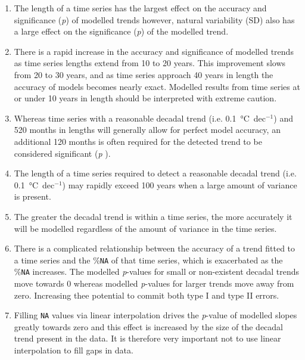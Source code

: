 \documentclass[]{ametsoc}
\begin{document}
\begin{enumerate}
\item The length of a time series has the largest effect on the accuracy and significance (\emph{p}) of modelled trends however, natural variability (SD) also has a large effect on the significance (\emph{p}) of the modelled trend.

\item There is a rapid increase in the accuracy and significance of modelled trends as time series lengths extend from 10 to 20 years. This improvement slows from 20 to 30 years, and as time series approach 40 years in length the accuracy of models becomes nearly exact. Modelled results from time series at or under 10 years in length should be interpreted with extreme caution.

\item Whereas time series with a reasonable decadal trend (i.e. \SI{0.1}{\degreeCelsius}~dec$^{-1}$) and 520 months in lengths will generally allow for perfect model accuracy, an additional 120 months is often required for the detected trend to be considered significant (\emph{p} ).


\item The length of a time series required to detect a reasonable decadal trend (i.e. \SI{0.1}{\degreeCelsius}~dec$^{-1}$) may rapidly exceed 100 years when a large amount of variance is present.


\item The greater the decadal trend is within a time series, the more accurately it will be modelled regardless of the amount of variance in the time series.


\item There is a complicated relationship between the accuracy of a trend fitted to a time series and the \%\texttt{NA} of that time series, which is exacerbated as the \%\texttt{NA} increases. The modelled \emph{p}-values for small or non-existent decadal trends move towards 0 whereas modelled \emph{p}-values for larger trends move away from zero. Increasing thee potential to commit both type I and type II errors.

\item Filling \texttt{NA} values via linear interpolation drives the \emph{p}-value of modelled slopes greatly towards zero and this effect is increased by the size of the decadal trend present in the data. It is therefore very important not to use linear interpolation to fill gaps in data.



\end{enumerate}
\end{document}
